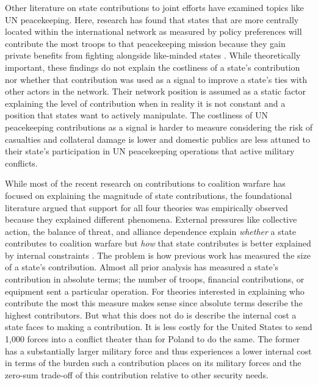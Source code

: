 \documentclass[12pt,letterpaper]{article}
\begin{document}
	Other literature on state contributions to joint efforts have examined topics like UN peacekeeping. Here, research has found that states that are more centrally located within the international network as measured by policy preferences will contribute the most troops to that peacekeeping mission because they gain private benefits from fighting alongside like-minded states \citep{dorussen_networkedinternationalpolitics_2016}. While theoretically important, these findings do not explain the costliness of a state's contribution nor whether that contribution was used as a signal to improve a state's ties with other actors in the network. Their network position is assumed as a static factor explaining the level of contribution when in reality it is not constant and a position that states want to actively manipulate. The costliness of UN peacekeeping contributions as a signal is harder to measure considering the risk of casualties and collateral damage is lower and domestic publics are less attuned to their state's participation in UN peacekeeping operations that active military conflicts.

	While most of the recent research on contributions to coalition warfare has focused on explaining the magnitude of state contributions, the foundational literature argued that support for all four theories was empirically observed because they explained different phenomena. External pressures like collective action, the balance of threat, and alliance dependence explain \textit{whether} a state contributes to coalition warfare but \textit{how} that state contributes is better explained by internal constraints \citep{bennett_burdensharingpersiangulf_1994}. The problem is how previous work has measured the size of a state's contribution. Almost all prior analysis has measured a state's contribution in absolute terms; the number of troops, financial contributions, or equipment sent a particular operation. For theories interested in explaining who contribute the most this measure makes sense since absolute terms describe the highest contributors. But what this does not do is describe the internal cost a state faces to making a contribution. It is less costly for the United States to send 1,000 forces into a conflict theater than for Poland to do the same. The former has a substantially larger military force and thus experiences a lower internal cost in terms of the burden such a contribution places on its military forces and the zero-sum trade-off of this contribution relative to other security needs.
\end{document}
